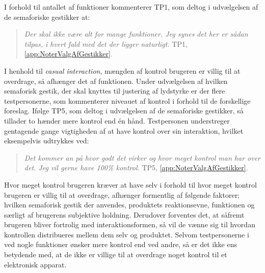I forhold til antallet af funktioner kommenterer TP1, som deltog i udvælgelsen af de semaforiske gestikker at: 
%
\begin{quotation}
	\noindent
	\textit{Der skal ikke være alt for mange funktioner. Jeg synes det her er sådan tilpas, i hvert fald med det der ligger naturligt.} TP1, \autoref{app:NoterValgAfGestikker}.
\noindent
\end{quotation}
%
I henhold til \textit{casual interaction}, mængden af kontrol brugeren er villig til at overdrage, så afhænger det af funktionen. Under udvælgelsen af hvilken semaforisk gestik, der skal knyttes til justering af lydstyrke er der flere testpersonerne, som kommenterer niveauet af kontrol i forhold til de forskellige foreslag. Ifølge TP5, som deltog i udvælgelsen af de semaforiske gestikker, så tillader to hænder mere kontrol end én hånd. Testpersonen understreger gentagende gange vigtigheden af at have kontrol over sin interaktion, hvilket eksempelvis udtrykkes ved: 
%
\begin{quotation}
	\noindent
	\textit{Det kommer an på hvor godt det virker og hvor meget kontrol man har over det. Jeg vil gerne have 100\% kontrol.} TP5, \autoref{app:NoterValgAfGestikker}.
\noindent
\end{quotation}
%
Hvor meget kontrol brugeren kræver at have selv i forhold til hvor meget kontrol brugeren er villig til at overdrage, afhænger formentlig af følgende faktorer; hvilken semaforisk gestik der anvendes, produktets reaktionsevne, funktionen og særligt af brugerens subjektive holdning. Derudover forventes det, at såfremt brugeren bliver fortrolig med interaktionsformen, så vil de vænne sig til hvordan kontrollen distribueres mellem dem selv og produktet. Selvom testpersonerne i ved nogle funktioner ønsker mere kontrol end ved andre, så er det ikke ens betydende med, at de ikke er villige til at overdrage noget kontrol til et elektronisk apparat. 

